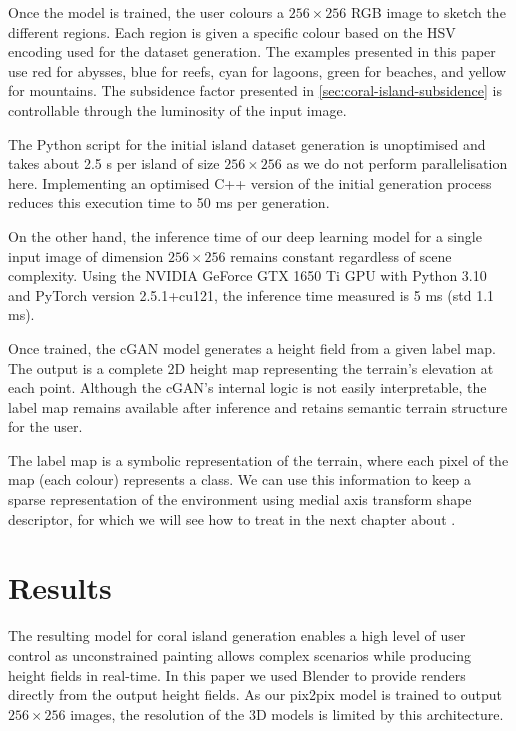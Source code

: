 Once the model is trained, the user colours a $256\times256$ RGB image to sketch the different regions. Each region is given a specific colour based on the HSV encoding used for the dataset generation. The examples presented in this paper use red for abysses, blue for reefs, cyan for lagoons, green for beaches, and yellow for mountains. The subsidence factor presented in \cref{sec:coral-island-subsidence} is controllable through the luminosity of the input image.

The Python script for the initial island dataset generation is unoptimised and takes about 2.5 s per island of size $256 \times 256$ as we do not perform parallelisation here. Implementing an optimised C++ version of the initial generation process reduces this execution time to 50 ms per generation.

On the other hand, the inference time of our deep learning model for a single input image of dimension $256 \times 256$ remains constant regardless of scene complexity. Using the NVIDIA GeForce GTX 1650 Ti GPU with Python 3.10 and PyTorch version 2.5.1+cu121, the inference time measured is 5 ms (std 1.1 ms).

Once trained, the cGAN model generates a height field from a given label map. The output is a complete 2D height map representing the terrain's elevation at each point. Although the cGAN's internal logic is not easily interpretable, the label map remains available after inference and retains semantic terrain structure for the user.

The label map is a symbolic representation of the terrain, where each pixel of the map (each colour) represents a class. We can use this information to keep a sparse representation of the environment using medial axis transform shape descriptor, for which we will see how to treat in the next chapter about .


\section{Results}
\label{sec:coral-island-results}

The resulting model for coral island generation enables a high level of user control as unconstrained painting allows complex scenarios while producing height fields in real-time. In this paper we used Blender to provide renders directly from the output height fields. As our pix2pix model is trained to output $256\times256$ images, the resolution of the 3D models is limited by this architecture.

